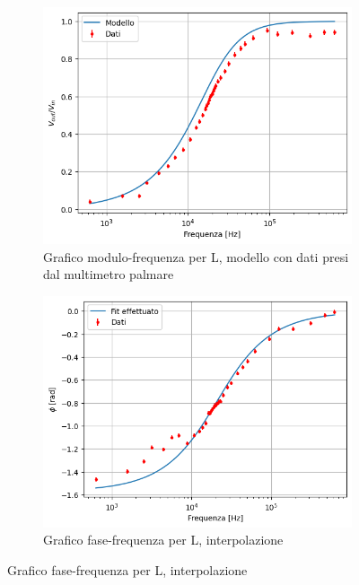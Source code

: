 \documentclass[letterpaper,12pt]{article}
\begin{document}
\begin{figure}[p] %
    \centering
    \begin{subfigure}[b]{0.45\textwidth}
        \centering
        \includegraphics[width=\textwidth]{RL_L_modulo_modello.png}
        \caption{Grafico modulo-frequenza per L, modello con dati presi dal multimetro palmare}
        \label{fig:RL_L_modulo_modello}
    \end{subfigure}
    \hfill
    \begin{subfigure}[b]{0.45\textwidth}
        \centering
        \includegraphics[width=\textwidth]{RL_L_fase.png}
        \caption{Grafico fase-frequenza per L, interpolazione}
        \label{fig:RL_L_fase}
    \end{subfigure}
    

\end{figure}
\end{document}
